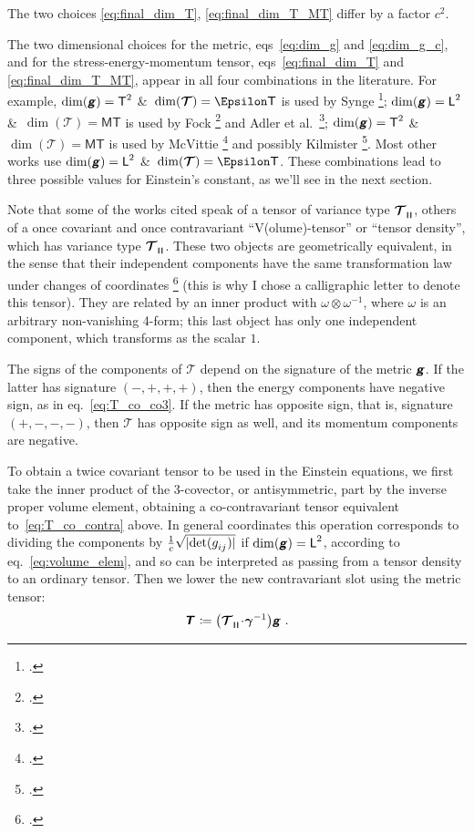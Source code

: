 \documentclass[\ifafour a4paper,12pt,\else a5paper,10pt,\fi%
onecolumn,oneside,article,%
british%
]{memoir}
\makeatletter
\theoremstyle{remark}
\theoremstyle{innote}
\newcommand*{\mathte}[1]{\textbf{\textit{\textsf{#1}}}}
\newcommand*{\citep}{\footcites}
\newcommand*{\amp}{\&}
\newcommand*{\defd}{\coloneqq}
\DeclarePairedDelimiter\abs{\lvert}{\rvert}
\renewcommand*{\|}[1][]{\nonscript\,#1\vert\nonscript\;\mathopen{}}
\newcommand*{\sect}{\S}%
\newcommand*{\sects}{\S\S}%
\newcommand*{\chaps}{chs}%
\newcommand*{\eqn}{eq.}%
\newcommand*{\eqns}{eqs}%
\newcommand*{\etal}{{et al.}}
\newcommand*{\q}{}%
\DeclareRobustCommand*{\q}{%
  \mathord{\mathpalette\bigcdot@{}}%
}
\newcommand*{\bigcdot@scalefactor}{0.7}
\newcommand*{\bigcdot@widthfactor}{1.5}
\newcommand*{\bigcdot@}[2]{%
  \sbox0{$#1\vcenter{}$}%
  \sbox2{$#1\cdot\m@th$}%
  \hbox to \bigcdot@widthfactor\wd2{%
    \hfil
    \raise\ht0\hbox{%
      \scalebox{\bigcdot@scalefactor}{%
        \lower\ht0\hbox{$#1\bullet\m@th$}%
      }%
    }%
    \hfil
  }%
}
\newcommand*{\Le}{\textsf{L}}
\newcommand*{\Ti}{\textsf{T}}
\newcommand*{\Ma}{\textsf{M}}
\newcommand*{\En}{\Epsilon}%
\newcommand*{\ii}{\mathbin{\!\cdot\!}}
\newcommand*{\rii}{\ii}
\newcommand*{\yg}{\mathte{g}}
\newcommand*{\yT}{\bm{\mathcal{T}}}
\newcommand*{\yTe}{\mathte{T}}
\renewcommand*{\i}{\indices}
\newcommand*{\ygv}{\bm{\gamma}}
\newcommand*{\rul}{{\mkern2mu\rule[-0.1ex]{0.75pt}{1.1ex}\mkern2mu}}
\DeclarePairedDelimiter\mul{\rul}{\rul}%
\makeatother
\begin{document}
The two choices \eqref{eq:final_dim_T}, \eqref{eq:final_dim_T_MT} differ by
a factor $c^{2}$.

\medskip

The two dimensional choices for the metric, \eqns~\eqref{eq:dim_g} and
\eqref{eq:dim_g_c}, and for the stress-energy-momentum tensor,
\eqns~\eqref{eq:final_dim_T} and \eqref{eq:final_dim_T_MT}, appear in all
four combinations in the literature. For example, $\dim(\yg)=\Ti^{2}$ \amp\
$\dim(\yT)=\En\Ti$ is used by Synge \citep[\sects~IV.4--5]{synge1960b};
$\dim(\yg)=\Le^{2}$ \amp\ $\dim(\yT)=\Ma\Ti$ is used by Fock
\citep[\sects~V.54--55]{fock1955_t1964} and Adler \etal\
\citep[\sect~10.1]{adleretal1965_r1975}; $\dim(\yg)=\Ti^{2}$ \amp\
$\dim(\yT)=\Ma\Ti$ is used by McVittie
\citep[\sect~4.1]{mcvittie1956_r1965} and possibly Kilmister
\citep[\chaps~II--III; he seems to shift to natural units at some
point]{kilmister1973}. Most other works use $\dim(\yg)=\Le^{2}$ \amp\
$\dim(\yT)=\En\Ti$. These combinations lead to three possible values for
Einstein's constant, as we'll see in the next section.

\medskip

Note that some of the works cited speak of a tensor of variance type
$\yT\i{_{\q \mul{\q\q\q}}}$, others of a once covariant and once
contravariant \enquote{V(olume)-tensor} or \enquote{tensor density}, which
has variance type $\yT\i{_{\q}^{\q}_{\mul{\q\q\q\q}}}$. These two objects
are geometrically equivalent, in the sense that their independent
components have the same transformation law under changes of coordinates
\citep[\sect~II.8 p.~30]{schouten1951_r1989} (this is why I chose a
calligraphic letter to denote this tensor). They are related by an inner
product with $\omega\otimes\omega^{-1}$, where $\omega$ is an arbitrary
non-vanishing 4-form; this last object has only one independent component,
which transforms as the scalar $1$.

The signs of the components of $\yT$ depend on the signature of the metric
$\yg$. If the latter has signature $(-,+,+,+)$, then the energy components
have negative sign, as in \eqn~\eqref{eq:T_co_co3}. If the metric has
opposite sign, that is, signature $(+,-,-,-)$, then $\yT$ has opposite sign
as well, and its momentum components are negative.

\medskip

To obtain a twice covariant tensor to be used in the Einstein equations, we
first take the inner product of the 3-covector, or antisymmetric, part by
the inverse proper volume element, obtaining a co-contravariant tensor
equivalent to~\eqref{eq:T_co_contra} above. In general coordinates this
operation corresponds to dividing the components by
$\frac{1}{c}\sqrt{\smash[b]{\abs{\det(g\i{_{ij}})}}}$ if
$\dim(\yg)=\Le^{2}$, according to \eqn~\eqref{eq:volume_elem}, and so can
be interpreted as passing from a tensor density to an ordinary tensor. Then
we lower the new contravariant slot using the metric tensor:
\begin{gather}
  \label{eq:co_co_T}
  \yTe\i{_{\q\q}} \defd
  \bigl(\yT\i{_{\q\mul{\q\q\q}}} \rii \ygv^{-1} \bigr) \yg \ .
\end{gather}
\end{document}
